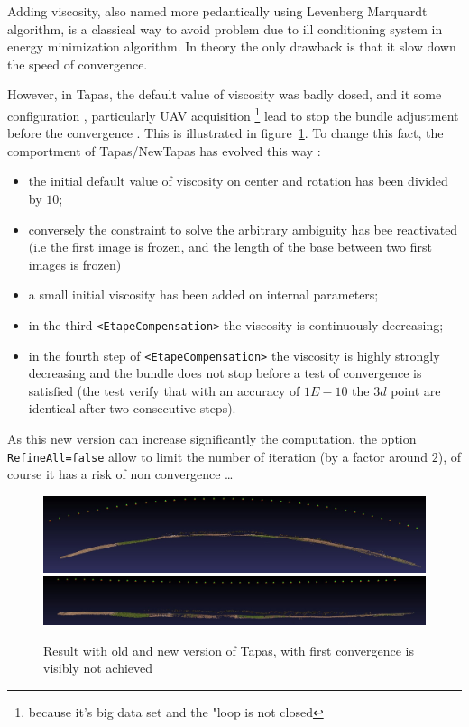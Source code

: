 Adding viscosity, also named more pedantically using Levenberg Marquardt algorithm,
is a classical way to avoid problem due to ill conditioning system in energy minimization algorithm.
In theory the only drawback is that it slow down the speed of convergence.

However, in Tapas, the default value of viscosity was badly dosed, and it  some configuration ,
particularly UAV acquisition \footnote{because it's big data set and the "loop is not closed}
lead to stop the bundle adjustment before the convergence . This is illustrated in figure~\ref{ImOldNewTapas}.
 To change this fact, the comportment of Tapas/NewTapas has evolved this way :

\begin{itemize}
    \item  the initial default value of viscosity  on center and rotation has been divided by $10$;
    \item  conversely the constraint to solve the arbitrary ambiguity has bee reactivated (i.e the first image is
           frozen, and the length of the base between two first images is frozen)
    \item  a small initial viscosity has been added on internal parameters;
    \item  in the third {\tt <EtapeCompensation>} the viscosity is continuously decreasing;
    \item  in the fourth step of  {\tt <EtapeCompensation>} the viscosity is highly strongly decreasing and
           the bundle does not stop before a test of convergence is satisfied (the test verify that with an
           accuracy of $1E-10$ the $3d$ point are identical after two consecutive steps).
\end{itemize}

As this new version can increase significantly the computation, the option {\tt RefineAll=false}
allow to limit the number of iteration (by a factor around $2$), of course it has a risk of non convergence \dots


\begin{figure}
\begin{center}
   \includegraphics[width=120mm]{FIGS/NewTapas/Old00.jpg}
   \includegraphics[width=120mm]{FIGS/NewTapas/New00.jpg}
\end{center}
\caption{Result with old and new version of Tapas, with first convergence is visibly not achieved}
\label{ImOldNewTapas}
\end{figure}


